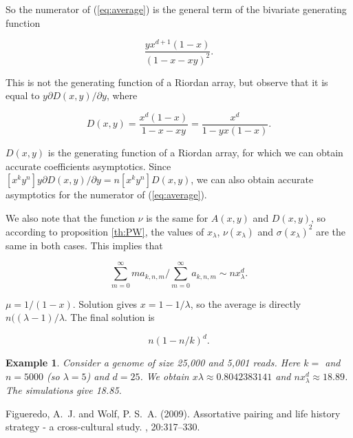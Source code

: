 \documentclass{article}
\newtheorem{example}{Example}
\begin{document}
So the numerator of (\ref{eq:average}) is the general term of the
bivariate generating function

\begin{equation*}
\frac{yx^{d+1}(1-x)}{\left(1-x-xy\right)^2}.
\end{equation*}

This is not the generating function of a Riordan array, but observe that
it is equal to $y\partial D(x,y)/\partial y$, where

\begin{equation*}
D(x,y) = \frac{x^d(1-x)}{1-x-xy} =
\frac{x^d}{1-yx(1-x)}.
\end{equation*}

$D(x,y)$ is the generating function of a Riordan array, for which we can
obtain accurate coefficients asymptotics. Since $[x^ky^n]y\partial D(x,y)
/ \partial y = n[x^ky^n]D(x,y)$, we can also obtain accurate
asymptotics for the numerator of (\ref{eq:average}).

We also note that the function $\nu$ is the same for $A(x,y)$ and
$D(x,y)$, so according to proposition \ref{th:PW}, the values of
$x_\lambda$, $\nu(x_\lambda)$ and $\sigma(x_\lambda)^2$ are the same in
both cases. This implies that

\begin{equation*}
\sum_{m=0}^\infty ma_{k,n,m}\Big/\sum_{m=0}^\infty a_{k,n,m} \sim
n x_\lambda^d.
\end{equation*}

$\mu = 1/(1-x)$. Solution gives $x = 1-1/\lambda$, so the average is
directly $n((\lambda-1)/\lambda$. The final solution is

\begin{equation*}
n\left(1-n/k\right)^d.
\end{equation*}

\begin{example}
Consider a genome of size 25,000 and 5,001 reads. Here $k = $ and $n =
5000$ (so $\lambda = 5$) and $d = 25$. We obtain $x\lambda \approx
0.8042383141$ and $n x_\lambda^d \approx 18.89$. The simulations give
18.85.
\end{example}


\begin{thebibliography}{99}

Figueredo, A.~J. and Wolf, P. S.~A. (2009).
\newblock Assortative pairing and life history strategy - a cross-cultural
  study.
, 20:317--330.
 
\end{thebibliography}

\end{document}

